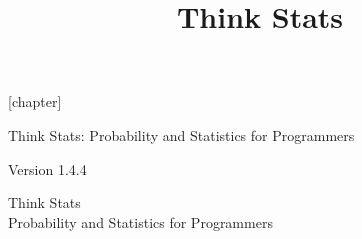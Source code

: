 \documentclass[12pt]{book}
\title{Think Stats}
\newcommand{\theversion}{1.4.4}
\begin{document}
\frontmatter





[chapter]
\newcommand{\nextexercise}{\refstepcounter{exercise}}

\newenvironment{exercise}
{\nextexercise\par\noindent\textbf{Exercise \thechapter.\theexercise}
\begin{itshape}\noindent}
{\end{itshape}}


\begin{latexonly}

\renewcommand{\blankpage}{\thispagestyle{empty} \quad \newpage}



\thispagestyle{empty}

\begin{flushright}
\vspace*{2.0in}

\begin{spacing}{3}
{\huge Think Stats: Probability and Statistics for Programmers}\\
{\Large }
\end{spacing}

\vspace{0.25in}

Version \theversion

\vfill

\end{flushright}


\blankpage
\blankpage

\pagebreak
\thispagestyle{empty}

\begin{flushright}
\vspace*{2.0in}

\begin{spacing}{3}
{\huge Think Stats}\\
{\Large Probability and Statistics for Programmers}
\end{spacing}


\end{flushright}
\end{latexonly}
\end{document}
